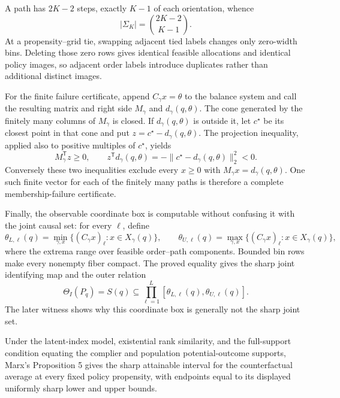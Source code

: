 A path has \(2K-2\) steps, exactly \(K-1\) of each orientation, whence
\[
|\Sigma_K|=\binom{2K-2}{K-1}.
\]
At a propensity--grid tie, swapping adjacent tied labels changes only zero-width bins.  Deleting those zero rows gives identical feasible allocations and identical policy images, so adjacent order labels introduce duplicates rather than additional distinct images.

For the finite failure certificate, append \(C_\gamma x=\theta\) to the balance system and call the resulting matrix and right side \(M_\gamma\) and \(d_\gamma(q,\theta)\).  The cone generated by the finitely many columns of \(M_\gamma\) is closed.  If \(d_\gamma(q,\theta)\) is outside it, let \(c^\star\) be its closest point in that cone and put \(z=c^\star-d_\gamma(q,\theta)\).  The projection inequality, applied also to positive multiples of \(c^\star\), yields
\[
M_\gamma^{\mathsf T}z\ge0,\qquad
z^{\mathsf T}d_\gamma(q,\theta)=-\|c^\star-d_\gamma(q,\theta)\|_2^2<0.
\]
Conversely these two inequalities exclude every \(x\ge0\) with \(M_\gamma x=d_\gamma(q,\theta)\).  One such finite vector for each of the finitely many paths is therefore a complete membership-failure certificate.

Finally, the observable coordinate box is computable without confusing it with the joint causal set: for every \(\ell\), define
\[
\theta_{L,\ell}(q)=\min_{\gamma,x}\{(C_\gamma x)_\ell:x\in X_\gamma(q)\},\qquad
\theta_{U,\ell}(q)=\max_{\gamma,x}\{(C_\gamma x)_\ell:x\in X_\gamma(q)\},
\]
where the extrema range over feasible order--path components.  Bounded bin rows make every nonempty fiber compact.  The proved equality gives the sharp joint identifying map and the outer relation
\[
\Theta_I(P_q)=S(q)\subseteq\prod_{\ell=1}^L[\theta_{L,\ell}(q),\theta_{U,\ell}(q)].
\]
The later witness shows why this coordinate box is generally not the sharp joint set.

Under the latent-index model, existential rank similarity, and the full-support condition equating the complier and population potential-outcome supports, Marx's Proposition 5 gives the sharp attainable interval for the counterfactual average at every fixed policy propensity, with endpoints equal to its displayed uniformly sharp lower and upper bounds.

